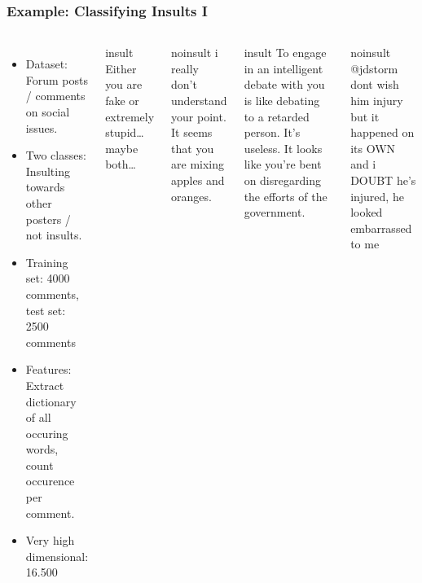 \begin{frame}
    \frametitle{Example: Classifying Insults I}
    \begin{columns}
        \begin{itemize}
            \item Dataset: Forum posts / comments on social issues.
            \item Two classes: Insulting towards other posters / not insults.
            \item Training set: 4000 comments, test set: 2500 comments
            \item Features: Extract dictionary of all occuring words, count occurence per comment.
            \item Very high dimensional: 16.500
            \end{itemize}
            \begin{beamercolorbox}[sep=1em,wd=5cm]{insult}
                Either you are fake or extremely stupid\dots maybe both\dots\\
            \end{beamercolorbox}
            \vspace{1em}

            \begin{beamercolorbox}[sep=1em,wd=5cm]{noinsult}
                i really don't understand your point. It seems that you are
                mixing apples and oranges.\\
            \end{beamercolorbox}
            \vspace{1em}

            \begin{beamercolorbox}[sep=1em,wd=5cm]{insult}
                To engage in an intelligent debate with
                you is like debating to a retarded person.  It's useless.  It
                looks like you're bent on disregarding the efforts of the
                government.
            \end{beamercolorbox}
            \vspace{1em}

            \begin{beamercolorbox}[sep=1em,wd=5cm]{noinsult}
                @jdstorm dont wish him injury but it happened on its OWN and i
                DOUBT he's injured, he looked embarrassed to me\\
            \end{beamercolorbox}
    \end{columns}
\end{frame}



